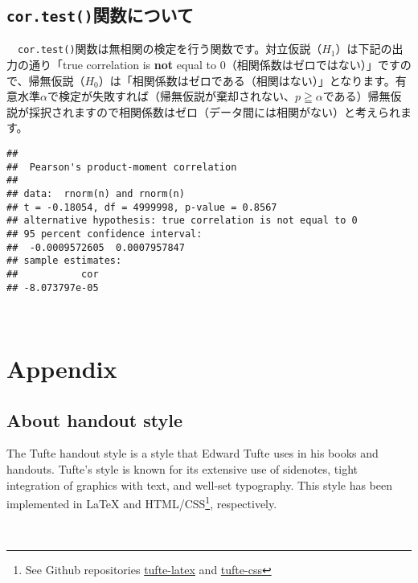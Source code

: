 \documentclass[]{tufte-handout}
\begin{document}
　

\hypertarget{cor.testux95a2ux6570ux306bux3064ux3044ux3066}{%
\subsection{\texorpdfstring{\texttt{cor.test()}関数について}{cor.test()関数について}}\label{cor.testux95a2ux6570ux306bux3064ux3044ux3066}}

　\texttt{cor.test()}関数は無相関の検定を行う関数です。対立仮説（\(H_1\)）は下記の出力の通り「true
correlation is \textbf{not} equal to
0（相関係数はゼロではない）」ですので、帰無仮説（\(H_0\)）は「相関係数はゼロである（相関はない）」となります。有意水準\(\alpha\)で検定が失敗すれば（帰無仮説が棄却されない、\(p \geqq \alpha\)である）帰無仮説が採択されますので相関係数はゼロ（データ間には相関がない）と考えられます。

\begin{verbatim}
## 
##  Pearson's product-moment correlation
## 
## data:  rnorm(n) and rnorm(n)
## t = -0.18054, df = 4999998, p-value = 0.8567
## alternative hypothesis: true correlation is not equal to 0
## 95 percent confidence interval:
##  -0.0009572605  0.0007957847
## sample estimates:
##           cor 
## -8.073797e-05
\end{verbatim}

　

\hypertarget{appendix}{%
\section{Appendix}\label{appendix}}

\hypertarget{about-handout-style}{%
\subsection{About handout style}\label{about-handout-style}}

The Tufte handout style is a style that Edward Tufte uses in his books
and handouts. Tufte's style is known for its extensive use of sidenotes,
tight integration of graphics with text, and well-set typography. This
style has been implemented in LaTeX and HTML/CSS\footnote{See Github
  repositories
  \href{https://github.com/tufte-latex/tufte-latex}{tufte-latex} and
  \href{https://github.com/edwardtufte/tufte-css}{tufte-css}},
respectively.

　


\end{document}
